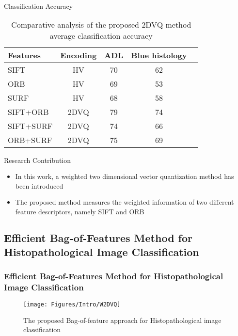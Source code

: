 \documentclass [9pt,times] {beamer}
\begin{document}
\begin{frame}{Classification Accuracy}
\begin{table}
\renewcommand{\arraystretch}{1.2}
	\centering
	\scriptsize
	\caption{{\scriptsize Comparative analysis of the proposed 2DVQ method average classification accuracy}}
	\label{tab:adl}
	\begin{tabular}{|p{1.2in}|c|c|c|c|}
		\hline
		\textbf{Features}   &	\textbf{Encoding}	&	\textbf{ADL}	&	\textbf{Blue histology}		\\
		\hline
	SIFT	&	HV	&	70	&	62	\\
ORB	&	HV	&	69	&	53	\\
SURF	&	HV	&	68	&	58	\\
SIFT+ORB	&	2DVQ	&	79	&	74	\\
SIFT+SURF	&	2DVQ	&	74	&	66	\\
ORB+SURF	&	2DVQ	&	75	&	69	\\

	\hline	
	\end{tabular}
\end{table}
\end {frame}


\begin{frame}{Research Contribution}
\begin{itemize}
\justifying
\item In this work, a weighted two dimensional vector quantization method has been introduced\\[3ex]

\item The proposed method measures the weighted  information of two different feature descriptors, namely SIFT and ORB
\end{itemize}
\end{frame}

\subsection{Efficient Bag-of-Features Method for Histopathological Image Classification}
\begin{frame}[plain]\frametitle{Efficient Bag-of-Features Method for Histopathological Image Classification}
\begin{figure}
		\centering
		\texttt{[image: Figures/Intro/W2DVQ]}
		\caption{The proposed Bag-of-feature approach for Histopathological image classification \cite{caicedo2009}}
		\label{fig:bof2}
	\end{figure}
\end{frame}
\end{document}
